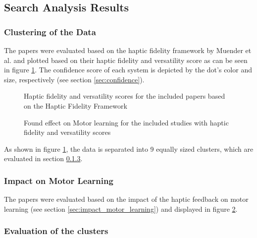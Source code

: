 \subsection{Search Analysis Results}

\subsubsection{Clustering of the Data}
The papers were evaluated based on the haptic fidelity framework by Muender et al. \cite{Muender2022HapticReality} and plotted based on their haptic fidelity and versatility score as can be seen in figure \ref{fig:fidelity_plot}. The confidence score of each system is depicted by the dot's color and size, respectively (see section \ref{sec:confidence}). 

\begin{figure}[!htbp]
\resizebox{0.99\textwidth}{!}{}
\caption{Haptic fidelity and versatility scores for the included papers based on the Haptic Fidelity Framework}
\label{fig:fidelity_plot}
\end{figure}

\begin{figure}[!htbp]
\resizebox{0.99\textwidth}{!}{}
\caption{Found effect on Motor learning for the included studies with haptic fidelity and versatility scores}
\label{fig:motorlearning_plot}
\end{figure}


As shown in figure \ref{fig:fidelity_plot}, the data is separated into 9 equally sized clusters, which are evaluated in section \ref{sec:evaluation_clusters}.


\subsubsection{Impact on Motor Learning}
The papers were evaluated based on the impact of the haptic feedback on motor learning (see section \ref{sec:impact_motor_learning}) and displayed in figure \ref{fig:motorlearning_plot}.


\subsubsection{Evaluation of the clusters}
\label{sec:evaluation_clusters}

